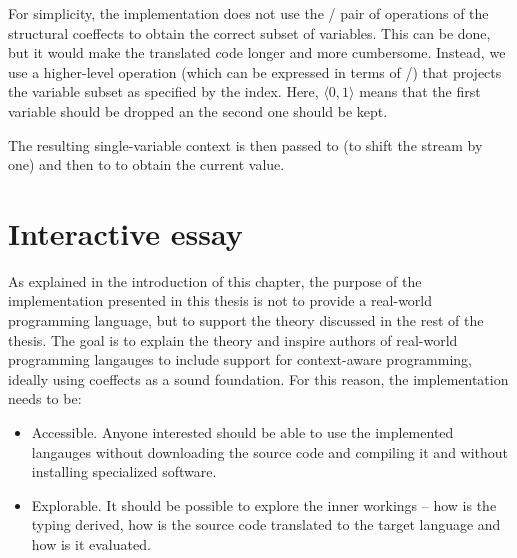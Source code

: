 For simplicity, the implementation does not use the / pair of operations
of the structural coeffects to obtain the correct subset of variables. This can be done, but it
would make the translated code longer and more cumbersome. Instead, we use a higher-level operation
 (which can be expressed in terms of /) that projects the
variable subset as specified by the index. Here, $\langle 0, 1\rangle$ means that the first variable
should be dropped an the second one should be kept.

The resulting single-variable context is then passed to  (to shift the stream by one)
and then to  to obtain the current value.


%
%

\section{Interactive essay}
\label{sec:impl-essay}

As explained in the introduction of this chapter, the purpose of the implementation presented in
this thesis is not to provide a real-world programming language, but to support the theory
discussed in the rest of the thesis. The goal is to explain the theory and inspire authors of
real-world programming langauges to include support for context-aware programming, ideally using
coeffects as a sound foundation. For this reason, the implementation needs to be:

\begin{itemize}
\item {\sc Accessible.}  Anyone interested should be able to use the implemented langauges without
  downloading the source code and compiling it and without installing specialized software.

\item {\sc Explorable.}  It should be possible to explore the inner workings -- how is the typing
  derived, how is the source code translated to the target language and how is it evaluated.
\end{itemize}

